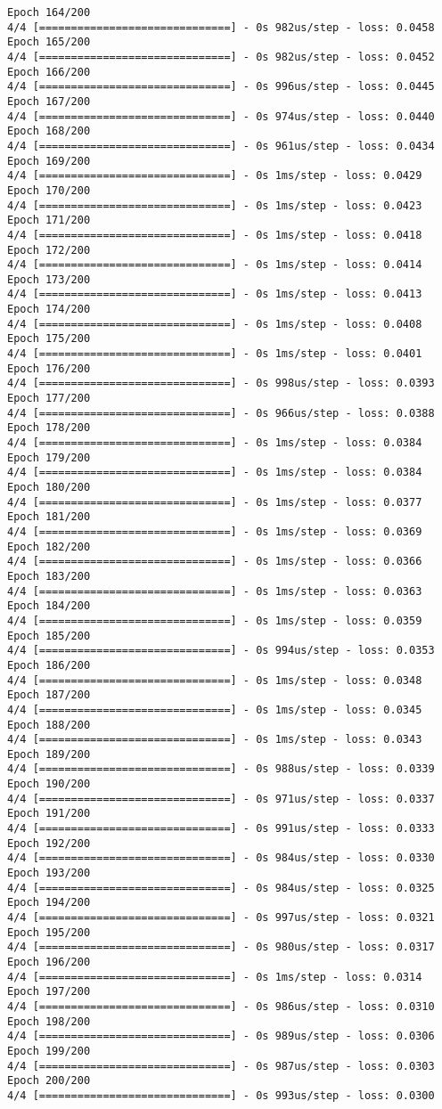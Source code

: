 \documentclass[11pt]{article}
\begin{document}
\begin{Verbatim}[commandchars=\\\{\}]
Epoch 164/200
4/4 [==============================] - 0s 982us/step - loss: 0.0458
Epoch 165/200
4/4 [==============================] - 0s 982us/step - loss: 0.0452
Epoch 166/200
4/4 [==============================] - 0s 996us/step - loss: 0.0445
Epoch 167/200
4/4 [==============================] - 0s 974us/step - loss: 0.0440
Epoch 168/200
4/4 [==============================] - 0s 961us/step - loss: 0.0434
Epoch 169/200
4/4 [==============================] - 0s 1ms/step - loss: 0.0429
Epoch 170/200
4/4 [==============================] - 0s 1ms/step - loss: 0.0423
Epoch 171/200
4/4 [==============================] - 0s 1ms/step - loss: 0.0418
Epoch 172/200
4/4 [==============================] - 0s 1ms/step - loss: 0.0414
Epoch 173/200
4/4 [==============================] - 0s 1ms/step - loss: 0.0413
Epoch 174/200
4/4 [==============================] - 0s 1ms/step - loss: 0.0408
Epoch 175/200
4/4 [==============================] - 0s 1ms/step - loss: 0.0401
Epoch 176/200
4/4 [==============================] - 0s 998us/step - loss: 0.0393
Epoch 177/200
4/4 [==============================] - 0s 966us/step - loss: 0.0388
Epoch 178/200
4/4 [==============================] - 0s 1ms/step - loss: 0.0384
Epoch 179/200
4/4 [==============================] - 0s 1ms/step - loss: 0.0384
Epoch 180/200
4/4 [==============================] - 0s 1ms/step - loss: 0.0377
Epoch 181/200
4/4 [==============================] - 0s 1ms/step - loss: 0.0369
Epoch 182/200
4/4 [==============================] - 0s 1ms/step - loss: 0.0366
Epoch 183/200
4/4 [==============================] - 0s 1ms/step - loss: 0.0363
Epoch 184/200
4/4 [==============================] - 0s 1ms/step - loss: 0.0359
Epoch 185/200
4/4 [==============================] - 0s 994us/step - loss: 0.0353
Epoch 186/200
4/4 [==============================] - 0s 1ms/step - loss: 0.0348
Epoch 187/200
4/4 [==============================] - 0s 1ms/step - loss: 0.0345
Epoch 188/200
4/4 [==============================] - 0s 1ms/step - loss: 0.0343
Epoch 189/200
4/4 [==============================] - 0s 988us/step - loss: 0.0339
Epoch 190/200
4/4 [==============================] - 0s 971us/step - loss: 0.0337
Epoch 191/200
4/4 [==============================] - 0s 991us/step - loss: 0.0333
Epoch 192/200
4/4 [==============================] - 0s 984us/step - loss: 0.0330
Epoch 193/200
4/4 [==============================] - 0s 984us/step - loss: 0.0325
Epoch 194/200
4/4 [==============================] - 0s 997us/step - loss: 0.0321
Epoch 195/200
4/4 [==============================] - 0s 980us/step - loss: 0.0317
Epoch 196/200
4/4 [==============================] - 0s 1ms/step - loss: 0.0314
Epoch 197/200
4/4 [==============================] - 0s 986us/step - loss: 0.0310
Epoch 198/200
4/4 [==============================] - 0s 989us/step - loss: 0.0306
Epoch 199/200
4/4 [==============================] - 0s 987us/step - loss: 0.0303
Epoch 200/200
4/4 [==============================] - 0s 993us/step - loss: 0.0300
    \end{Verbatim}
\end{document}
